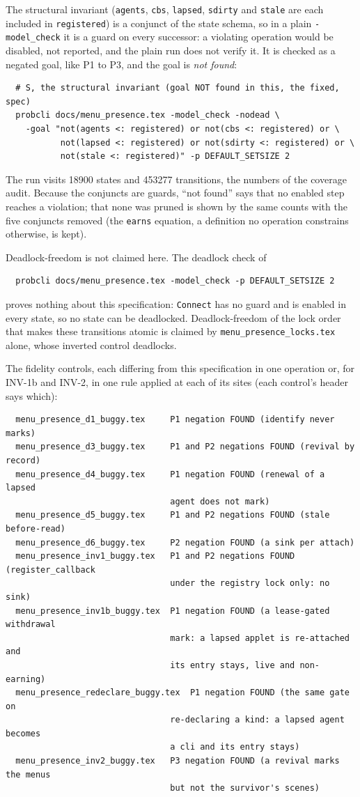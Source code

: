 \documentclass[a4paper,10pt,fleqn]{article}
\begin{document}
The structural invariant (\texttt{agents}, \texttt{cbs}, \texttt{lapsed},
\texttt{sdirty} and \texttt{stale} are each included in \texttt{registered}) is
a conjunct of the state schema, so in a plain \texttt{-model\_check} it is a
guard on every successor: a violating operation would be disabled, not
reported, and the plain run does not verify it.  It is checked as a negated
goal, like P1 to P3, and the goal is \emph{not found}:
\begin{verbatim}
  # S, the structural invariant (goal NOT found in this, the fixed, spec)
  probcli docs/menu_presence.tex -model_check -nodead \
    -goal "not(agents <: registered) or not(cbs <: registered) or \
           not(lapsed <: registered) or not(sdirty <: registered) or \
           not(stale <: registered)" -p DEFAULT_SETSIZE 2
\end{verbatim}
The run visits 18900 states and 453277 transitions, the numbers of the
coverage audit.  Because the conjuncts are guards, ``not found'' says that no
enabled step reaches a violation; that none was pruned is shown by the same
counts with the five conjuncts removed (the \texttt{earns} equation, a
definition no operation constrains otherwise, is kept).

Deadlock-freedom is not claimed here.  The deadlock check of
\begin{verbatim}
  probcli docs/menu_presence.tex -model_check -p DEFAULT_SETSIZE 2
\end{verbatim}
proves nothing about this specification: \texttt{Connect} has no guard and is
enabled in every state, so no state can be deadlocked.  Deadlock-freedom of the
lock order that makes these transitions atomic is claimed by
\texttt{menu\_presence\_locks.tex} alone, whose inverted control deadlocks.

The fidelity controls, each differing from this specification in one
operation or, for INV-1b and INV-2, in one rule applied at each of its sites
(each control's header says which):

\begin{verbatim}
  menu_presence_d1_buggy.tex     P1 negation FOUND (identify never marks)
  menu_presence_d3_buggy.tex     P1 and P2 negations FOUND (revival by record)
  menu_presence_d4_buggy.tex     P1 negation FOUND (renewal of a lapsed
                                 agent does not mark)
  menu_presence_d5_buggy.tex     P1 and P2 negations FOUND (stale before-read)
  menu_presence_d6_buggy.tex     P2 negation FOUND (a sink per attach)
  menu_presence_inv1_buggy.tex   P1 and P2 negations FOUND (register_callback
                                 under the registry lock only: no sink)
  menu_presence_inv1b_buggy.tex  P1 negation FOUND (a lease-gated withdrawal
                                 mark: a lapsed applet is re-attached and
                                 its entry stays, live and non-earning)
  menu_presence_redeclare_buggy.tex  P1 negation FOUND (the same gate on
                                 re-declaring a kind: a lapsed agent becomes
                                 a cli and its entry stays)
  menu_presence_inv2_buggy.tex   P3 negation FOUND (a revival marks the menus
                                 but not the survivor's scenes)
\end{verbatim}
\end{document}
